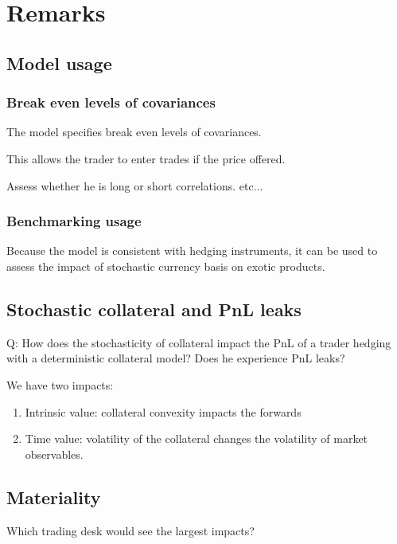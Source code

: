\documentclass[11pt,english]{amsart}
\theoremstyle{definition}
\begin{document}
\newpage%
\section{Remarks}





\subsection{Model usage}

\subsubsection{Break even levels of covariances}%
The model specifies break even levels of covariances. 

This allows the trader to enter trades if the price offered.

Assess whether he is long or short correlations. etc...


\subsubsection{Benchmarking usage}
Because the model is consistent with hedging instruments, it can be used to assess the impact of stochastic currency basis on exotic products. 




\subsection{Stochastic collateral and PnL leaks}%

Q: How does the stochasticity of collateral impact the PnL of a trader hedging with a deterministic collateral model? Does he experience PnL leaks?

We have two impacts: 
\begin{enumerate}
\item Intrinsic value: collateral convexity impacts the forwards
\item Time value: volatility of the collateral changes the volatility of market observables.
\end{enumerate}



\subsection{Materiality}%
Which trading desk would see the largest impacts? 
\end{document}
